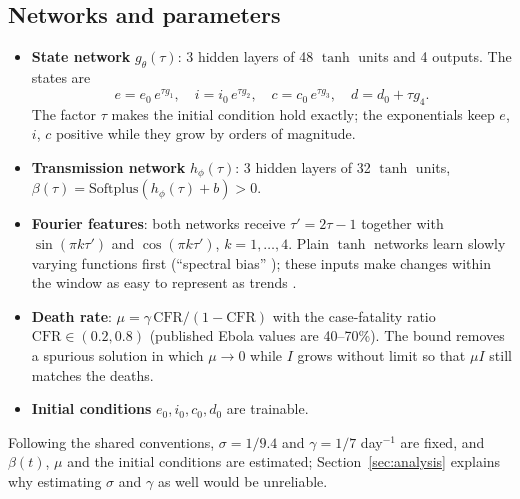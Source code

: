 \documentclass[11pt,a4paper]{article}
\begin{document}
\subsection{Networks and parameters}
\begin{itemize}
    \item \textbf{State network} $g_\theta(\tau)$: 3 hidden layers of 48 $\tanh$ units and 4 outputs. The states are
    \begin{equation}
        e = e_0\, e^{\tau g_1}, \quad i = i_0\, e^{\tau g_2}, \quad c = c_0\, e^{\tau g_3}, \quad d = d_0 + \tau g_4 .
    \end{equation}
    The factor $\tau$ makes the initial condition hold exactly; the exponentials keep $e$, $i$, $c$ positive while they grow by orders of magnitude.
    \item \textbf{Transmission network} $h_\phi(\tau)$: 3 hidden layers of 32 $\tanh$ units, $\beta(\tau) = \mathrm{Softplus}(h_\phi(\tau) + b) > 0$.
    \item \textbf{Fourier features}: both networks receive $\tau' = 2\tau - 1$ together with $\sin(\pi k \tau')$ and $\cos(\pi k \tau')$, $k = 1, \dots, 4$. Plain $\tanh$ networks learn slowly varying functions first (``spectral bias'' \cite{rahaman2019spectral}); these inputs make changes within the window as easy to represent as trends \cite{tancik2020fourier}.
    \item \textbf{Death rate}: $\mu = \gamma\,\mathrm{CFR}/(1 - \mathrm{CFR})$ with the case-fatality ratio $\mathrm{CFR} \in (0.2, 0.8)$ (published Ebola values are 40--70\%). The bound removes a spurious solution in which $\mu \to 0$ while $I$ grows without limit so that $\mu I$ still matches the deaths.
    \item \textbf{Initial conditions} $e_0, i_0, c_0, d_0$ are trainable.
\end{itemize}
Following the shared conventions, $\sigma = 1/9.4$ and $\gamma = 1/7$ day$^{-1}$ are fixed, and $\beta(t)$, $\mu$ and the initial conditions are estimated; Section~\ref{sec:analysis} explains why estimating $\sigma$ and $\gamma$ as well would be unreliable.
\end{document}
